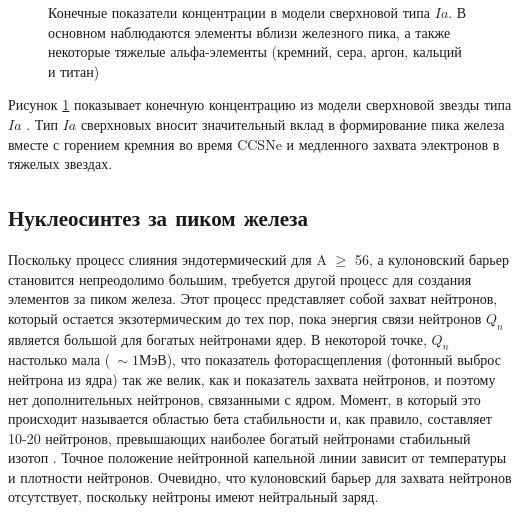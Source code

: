 \documentclass[14pt, a4paper]{article}
\numberwithin{figure}{section}
\numberwithin{equation}{section}
\begin{document}
\begin{figure}[ht]
	\caption{Конечные показатели концентрации в модели сверхновой типа $Ia$. В основном наблюдаются элементы вблизи железного пика, а также некоторые тяжелые альфа-элементы (кремний, сера, аргон, кальций и титан)}
	\label{ris:iron-abu}
\end{figure}

Рисунок \ref{ris:iron-abu} показывает конечную концентрацию из модели сверхновой звезды типа $Ia$ \cite{iron-abu}. Тип $Ia$ сверхновых вносит значительный вклад в формирование пика железа вместе с горением кремния во время CCSNe и медленного захвата электронов в тяжелых звездах.

\subsection{Нуклеосинтез за пиком железа}
Поскольку процесс слияния эндотермический для A $\ge$ 56, а кулоновский барьер становится непреодолимо большим, требуется другой процесс для создания элементов за пиком железа. Этот процесс представляет собой захват нейтронов, который остается экзотермическим до тех пор, пока энергия связи нейтронов $Q_n$ является большой для богатых нейтронами ядер. В некоторой точке, $Q_n$ настолько мала ($~\sim1 \text{МэВ}$), что показатель фоторасщепления (фотонный выброс нейтрона из ядра) так же велик, как и показатель захвата нейтронов, и поэтому нет дополнительных нейтронов, связанными с ядром. Момент, в который это происходит называется областью бета стабильности и, как правило, составляет 10-20 нейтронов, превышающих наиболее богатый нейтронами стабильный изотоп \cite{cauldrons}. Точное положение нейтронной капельной линии зависит от температуры и плотности нейтронов. Очевидно, что кулоновский барьер  для захвата нейтронов отсутствует, поскольку нейтроны имеют нейтральный заряд.
\end{document}
